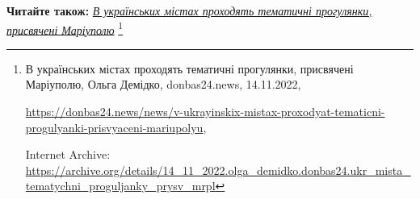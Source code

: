  
 
 
 
 

\textbf{Читайте також:} \href{https://archive.org/details/14_11_2022.olga_demidko.donbas24.ukr_mista_tematychni_proguljanky_prysv_mrpl}{\emph{В українських містах проходять тематичні прогулянки, присвячені Маріуполю}}%
\footnote{В українських містах проходять тематичні прогулянки, присвячені Маріуполю, Ольга Демідко, donbas24.news, 14.11.2022, \par%
\url{https://donbas24.news/news/v-ukrayinskix-mistax-proxodyat-tematicni-progulyanki-prisvyaceni-mariupolyu}, \par%
Internet Archive: \url{https://archive.org/details/14_11_2022.olga_demidko.donbas24.ukr_mista_tematychni_proguljanky_prysv_mrpl}%
}
